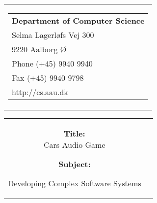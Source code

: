 \thispagestyle{empty}
\begin{titlepage}
\begin{nopagebreak}
{\samepage 
\begin{tabular}{r}
	\parbox{16cm}{
	\hfill \parbox{7cm}{\begin{tabular}{l}
		{\small \textbf{Department of Computer Science}}\\
		{\small Selma Lagerløfs Vej 300} \\
		{\small 9220 Aalborg Ø} \\
		{\small Phone (+45) 9940 9940} \\
		{\small Fax (+45) 9940 9798} \\
		{\small http://cs.aau.dk}
	\end{tabular}}
	}
\end{tabular}

\begin{tabular}{cc}
	\parbox{8cm}{
	\begin{description}
		\item { \textbf{Title:}}\\ 
			Cars Audio Game
    		\item { \textbf{Subject:}}\\ 
			\raggedright Developing Complex Software Systems
	\end{description}
	
}
\end{tabular}}
\end{nopagebreak}
\end{titlepage}
